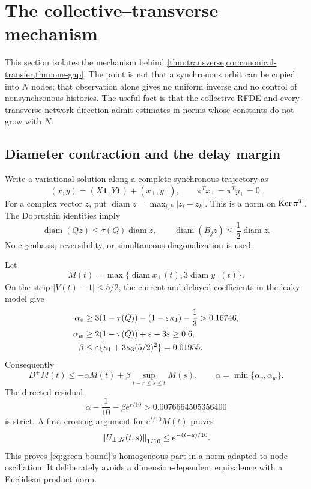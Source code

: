 \section{The collective--transverse mechanism}\label{sec:network-mechanism}

This section isolates the mechanism behind
\cref{thm:transverse,cor:canonical-transfer,thm:one-gap}.  The point is not
that a synchronous orbit can be copied into \(N\) nodes; that observation
alone gives no uniform inverse and no control of nonsynchronous histories.
The useful fact is that the collective RFDE and every transverse network
direction admit estimates in norms whose constants do not grow with \(N\).

\subsection{Diameter contraction and the delay margin}

Write a variational solution along a complete synchronous trajectory as
\[
 (x,y)=(X\mathbf1,Y\mathbf1)+(x_\perp,y_\perp),
 \qquad \pi^Tx_\perp=\pi^Ty_\perp=0.
\]
For a complex vector \(z\), put
\(\operatorname{diam} z=\max_{i,k}|z_i-z_k|\).  This is a norm on
\(\operatorname{Ker}\pi^T\).  The Dobrushin identities imply
\begin{equation}
 \operatorname{diam}(Qz)\le\tau(Q)\operatorname{diam} z,\qquad
 \operatorname{diam}(B_jz)\le\frac12\operatorname{diam} z.
                                                               \label{eq:dobrushin-diam}
\end{equation}
No eigenbasis, reversibility, or simultaneous diagonalization is used.

Let
\[
 M(t)=\max\{\operatorname{diam} x_\perp(t),
             3\operatorname{diam} y_\perp(t)\}.
\]
On the strip \(|V(t)-1|\le5/2\), the current and delayed coefficients in
the leaky model give
\begin{align}
 \alpha_v&\ge 3(1-\tau(Q))-(1-\varepsilon\kappa_1)-\frac13
          >0.16746,\\
 \alpha_w&\ge2(1-\tau(Q))+\varepsilon-3\varepsilon\ge0.6,\\
 \beta&\le\varepsilon\{\kappa_1+3\kappa_3(5/2)^2\}=0.01955.
                                                               \label{eq:halanay-data}
\end{align}
Consequently
\begin{equation}
 D^+M(t)\le-\alpha M(t)
       +\beta\sup_{t-r\le s\le t}M(s),\qquad
 \alpha=\min\{\alpha_v,\alpha_w\}.                     \label{eq:halanay}
\end{equation}
The directed residual
\begin{equation}
 \alpha-\frac1{10}-\beta e^{r/10}
 >0.0076664505356400                                    \label{eq:delay-margin}
\end{equation}
is strict.  A first-crossing argument for
\(e^{t/10}M(t)\) proves
\[
 \left\lVert U_{\perp,N}(t,s)\right\rVert_{1/10}\le e^{-(t-s)/10}.
\]
This proves \cref{eq:green-bound}'s homogeneous part in a norm adapted to
node oscillation.  It deliberately avoids a dimension-dependent
equivalence with a Euclidean product norm.

